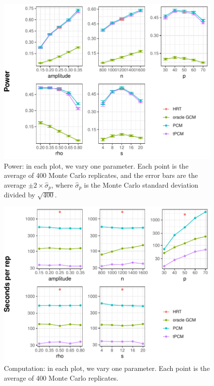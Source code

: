 \documentclass[12pt]{article}
\theoremstyle{definition}
\theoremstyle{remark}
\begin{document}
	\begin{figure}[H]
		\centering
		\includegraphics{figures/power_stat.pdf}
		\caption{Power: in each plot, we vary one parameter. Each point is the average of 400 Monte Carlo replicates, and the error bars are the average $\pm 2 \times \widehat{\sigma}_p$, where $\widehat{\sigma}_p$ is the Monte Carlo standard deviation divided by $\sqrt{400}$.}
		\label{fig:power}
	\end{figure}
	\begin{figure}[H]
		\centering
		\includegraphics{figures/computation_stat.pdf}
		\caption{Computation: in each plot, we vary one parameter. Each point is the average of 400 Monte Carlo replicates.}
		\label{fig:computation}
	\end{figure}
\end{document}

